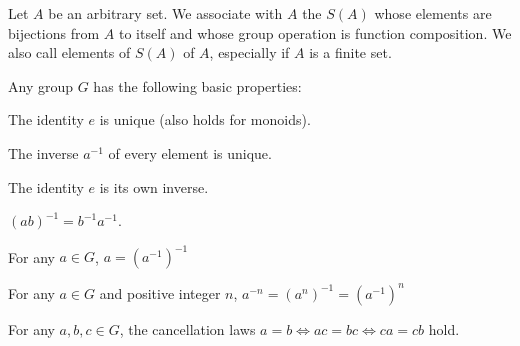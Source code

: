 \begin{definition}\label{def:symmetric_group}
  Let \( A \) be an arbitrary set. We associate with \( A \) the  \( S(A) \) whose elements are bijections from \( A \) to itself and whose group operation is function composition. We also call elements of \( S(A) \)  of \( A \), especially if \( A \) is a finite set.
\end{definition}

\begin{proposition}\label{def:group_properties}
  Any group \( G \) has the following basic properties:
  \begin{defenum}
    \item\label{def:group_properties/unique_identity} The identity \( e \) is unique (also holds for monoids).
    \item\label{def:group_properties/unique_inverse} The inverse \( a^{-1} \) of every element is unique.
    \item\label{def:group_properties/identity_inverse} The identity \( e \) is its own inverse.
    \item\label{def:group_properties/inverse_composition} \( (ab)^{-1} = b^{-1} a^{-1} \).
    \item\label{def:group_properties/double_inverse} For any \( a \in G \), \( a = (a^{-1})^{-1} \)
    \item\label{def:group_properties/negative_power} For any \( a \in G \) and positive integer \( n \), \( a^{-n} = (a^n)^{-1} = (a^{-1})^n \)
    \item\label{def:group_properties/cancellation} For any \( a, b, c \in G \), the cancellation laws \( a = b \iff ac = bc \iff ca = cb \) hold.
  \end{defenum}
\end{proposition}
